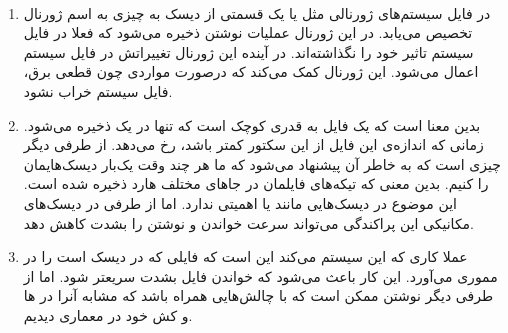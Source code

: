 \\\noindent
{}
\begin{enumerate}
    \item در فایل سیستم‌های ژورنالی مثل
     یا 
    یک قسمتی از دیسک به چیزی به اسم ژورنال تخصیص می‌یابد. در این ژورنال عملیات نوشتن ذخیره می‌شود که
    فعلا در فایل سیستم تاثیر خود را نگذاشته‌اند. در آینده این ژورنال تغییراتش در فایل سیستم اعمال می‌شود.
    این ژورنال کمک می‌کند که درصورت مواردی چون قطعی برق، فایل سیستم خراب نشود.
    \item {} بدین معنا است که یک فایل به قدری کوچک است که
    تنها در یک
    ذخیره می‌شود. زمانی که اندازه‌ی این فایل از این سکتور کمتر باشد،
    رخ می‌دهد. از طرفی دیگر
    چیزی است که به خاطر آن پیشنهاد می‌شود که ما هر چند وقت یک‌بار دیسک‌هایمان را
    کنیم. بدین معنی که تیکه‌های فایلمان در جا‌های مختلف هارد ذخیره شده است. این موضوع در دیسک‌هایی مانند
     یا 
    اهمیتی ندارد. اما از طرفی در دیسک‌های مکانیکی این پراکندگی می‌تواند سرعت خواندن و نوشتن را بشدت کاهش دهد.
    \item عملا کاری که این سیستم می‌کند این است که فایلی که در دیسک است را در مموری می‌آورد.
    این کار باعث می‌شود که خواندن فایل بشدت سریعتر شود. اما از طرفی دیگر نوشتن ممکن است که با چالش‌هایی همراه
    باشد که مشابه آنرا در
    ها و کش خود
    در معماری دیدیم.
\end{enumerate}